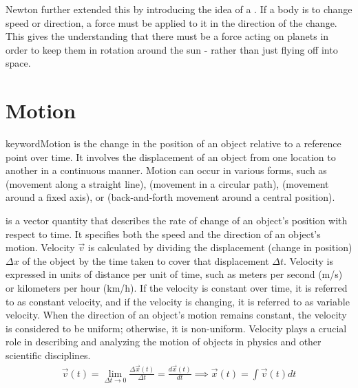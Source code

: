 Newton further extended this by introducing the idea of a . If a body is to change speed or direction, a force must be applied to it in the direction of the change. This gives the understanding that there must be a force acting on planets in order to keep them in rotation around the sun - rather than just flying off into space.








\section{Motion}

keyword{Motion} is the change in the position of an object relative to a reference point over time. It involves the displacement of an object from one location to another in a continuous manner. Motion can occur in various forms, such as  (movement along a straight line),  (movement in a circular path),  (movement around a fixed axis), or  (back-and-forth movement around a central position). 

 is a vector quantity that describes the rate of change of an object's position with respect to time. It specifies both the speed and the direction of an object's motion. Velocity $\vec{v}$ is calculated by dividing the displacement (change in position) $\Delta x$ of the object by the time taken to cover that displacement $\Delta t$. Velocity is expressed in units of distance per unit of time, such as meters per second (m/s) or kilometers per hour (km/h). If the velocity is constant over time, it is referred to as constant velocity, and if the velocity is changing, it is referred to as variable velocity. When the direction of an object's motion remains constant, the velocity is considered to be uniform; otherwise, it is non-uniform. Velocity plays a crucial role in describing and analyzing the motion of objects in physics and other scientific disciplines.
\begin{align}
\vec{v}(t)=\lim_{\Delta t \to 0}\frac{\Delta \vec{x}(t)}{\Delta t} = \frac{d\vec{x}(t)}{dt} \implies \vec{x}(t) = \int \vec{v}(t) dt
\end{align}

